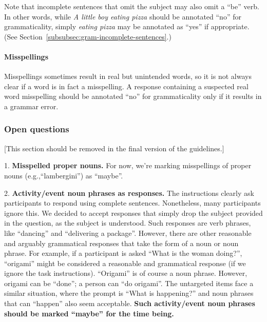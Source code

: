 \documentclass[12pt,notitlepage]{article}
\begin{document}
Note that incomplete sentences that omit the subject may also omit a ``be'' verb. In other words, while \textit{A little boy eating pizza} should be annotated ``no'' for grammaticality, simply \textit{eating pizza} may be annotated as ``yes'' if appropriate. (See Section~\ref{subsubsec:gram-incomplete-sentences}.)

\paragraph{Misspellings} Misspellings sometimes result in real but unintended words, so it is not always clear if a word is in fact a misspelling. A response containing a suspected real word misspelling should be annotated ``no'' for grammaticality only if it results in a grammar error.

\subsubsection{Open questions} [This section should be removed in the final version of the guidelines.]

1. \textbf{Misspelled proper nouns.} For now, we're marking misspellings of proper nouns (e.g.,``lambergini'') as ``maybe''.

2. \textbf{Activity/event noun phrases as responses.} The instructions clearly ask participants to respond using complete sentences. Nonetheless, many participants ignore this. We decided to accept responses that simply drop the subject provided in the question, as the subject is understood. Such responses are verb phrases, like ``dancing'' and ``delivering a package''. However, there are other reasonable and arguably grammatical responses that take the form of a noun or noun phrase. For example, if a participant is asked ``What is the woman doing?'', ``origami'' might be considered a reasonable and grammatical response (if we ignore the task instructions). ``Origami'' is of course a noun phrase. However, origami can be ``done''; a person can ``do origami''. The untargeted items face a similar situation, where the prompt is ``What is happening?'' and noun phrases that can ``happen'' also seem acceptable. \textbf{Such activity/event noun phrases should be marked ``maybe'' for the time being.}
\end{document}
